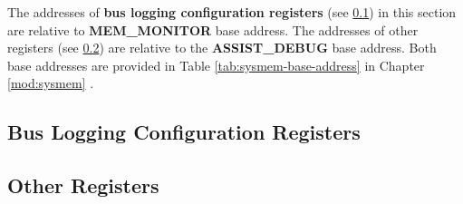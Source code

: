 \documentclass[main\_\_EN.tex]{subfiles}
\begin{document}
The addresses of \textbf{bus logging configuration registers} (see \ref{sec:dbgassist-mem-monitor-reg}) in this section are relative to \textbf{MEM\_MONITOR} base address. The addresses of other registers (see \ref{sec:dbgassist-bus-monitor-reg}) are relative to the \textbf{ASSIST\_DEBUG} base address. Both base addresses are provided in Table \ref{tab:sysmem-base-address} in Chapter \ref{mod:sysmem} \textit{}.

\subsection{Bus Logging Configuration Registers}
\label{sec:dbgassist-mem-monitor-reg}



\subsection{Other Registers}
\label{sec:dbgassist-bus-monitor-reg}


\end{document}
